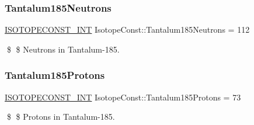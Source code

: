 \subsubsection{\texorpdfstring{Tantalum185\+Neutrons}{Tantalum185Neutrons}}
{\footnotesize\ttfamily \mbox{\hyperlink{group___isotope_const-_macros_ga5f18360b3e99483a35c32d789e62621c}{I\+S\+O\+T\+O\+P\+E\+C\+O\+N\+S\+T\+\_\+\+I\+NT}} Isotope\+Const\+::\+Tantalum185\+Neutrons = 112}

\$ \$ Neutrons in Tantalum-\/185. \mbox{\label{group___isotope_const-_tantalum-_ta185_gaee994f66cfeebbd094aedbfdec598ff9}} 
\subsubsection{\texorpdfstring{Tantalum185\+Protons}{Tantalum185Protons}}
{\footnotesize\ttfamily \mbox{\hyperlink{group___isotope_const-_macros_ga5f18360b3e99483a35c32d789e62621c}{I\+S\+O\+T\+O\+P\+E\+C\+O\+N\+S\+T\+\_\+\+I\+NT}} Isotope\+Const\+::\+Tantalum185\+Protons = 73}

\$ \$ Protons in Tantalum-\/185. 